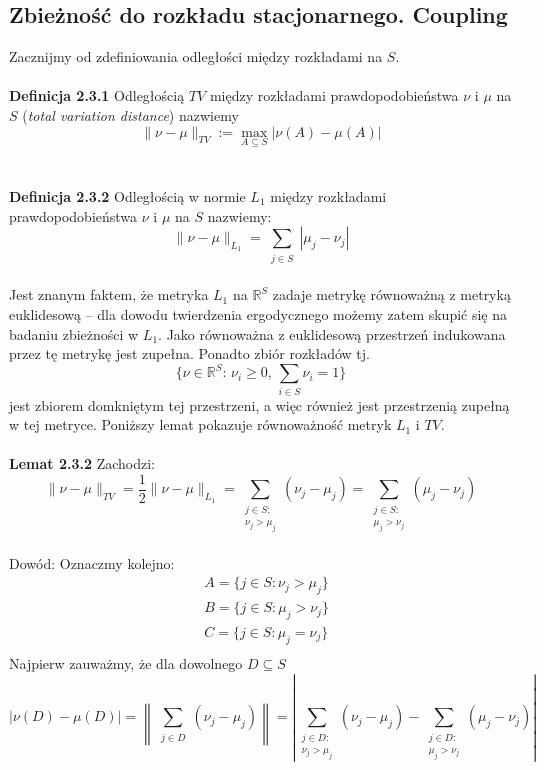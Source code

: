 \documentclass[a4paper]{article}
\begin{document}
\subsection{Zbieżność do rozkładu stacjonarnego. Coupling}
Zacznijmy od zdefiniowania odległości między rozkładami na $S$.\\\\
\textbf{Definicja 2.3.1}
Odległością $TV$ między rozkładami prawdopodobieństwa $\nu$ i $\mu$ na $S$ (\textit{total variation distance}) nazwiemy $$\|\nu - \mu\|_{TV} := \max\limits_{A \subseteq S} |\nu(A) - \mu(A)|$$\\
\\
\textbf{Definicja 2.3.2}
Odległością w normie $L_1$ między rozkładami prawdopodobieństwa $\nu$ i $\mu$ na $S$ nazwiemy:
$$\|\nu - \mu\|_{L_1} = \sum\limits_{\substack{j \in S}} |\mu_j - \nu_j|$$
\\
Jest znanym faktem, że metryka $L_1$ na $\mathbb{R}^S$ zadaje metrykę równoważną z metryką euklidesową – dla dowodu twierdzenia ergodycznego możemy zatem skupić się na badaniu zbieżności w $L_1$. Jako równoważna z euklidesową przestrzeń indukowana przez tę metrykę jest zupełna. Ponadto zbiór rozkładów tj.
$$\{\nu \in \mathbb{R}^S:\, \nu_i \geq 0, \, \sum\limits_{i \in S} \nu_i = 1\}$$
jest zbiorem domkniętym tej przestrzeni, a więc również jest przestrzenią zupełną w tej metryce. Poniższy lemat pokazuje równoważność metryk $L_1$ i $TV$.
\\\\
\textbf{Lemat 2.3.2}
Zachodzi:
$$\|\nu - \mu\|_{TV} = \frac{1}{2}\|\nu - \mu\|_{L_1} = \sum\limits_{\substack{j \in S:\\ \nu_j > \mu_j}} (\nu_j - \mu_j) = \sum\limits_{\substack{j \in S:\\ \mu_j > \nu_j}} (\mu_j - \nu_j)$$
\\
Dowód: Oznaczmy kolejno: \begin{align*}
&A = \{j \in S: \nu_j > \mu_j\}\\
&B = \{j \in S: \mu_j > \nu_j\}\\
&C = \{j \in S: \mu_j = \nu_j\}\\
\end{align*}
Najpierw zauważmy, że dla dowolnego $D \subseteq S$ $$|\nu(D) - \mu(D)| =  \left\| \sum\limits_{\substack{j \in D}} (\nu_j - \mu_j) \right\| =  \left\lvert \sum\limits_{\substack{j \in D:\\ \nu_j > \mu_j}} (\nu_j - \mu_j) - \sum\limits_{\substack{j \in D:\\ \mu_j > \nu_j}} (\mu_j - \nu_j) \right\rvert$$
\end{document}
